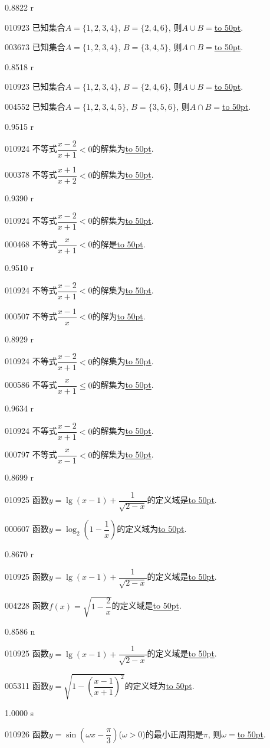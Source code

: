 \documentclass[10pt,a4paper]{article}
\newcommand{\blank}[1]{\underline{\hbox to #1pt{}}}
\begin{document}
0.8822 r

010923	已知集合$A=\{1,2,3,4\}$, $B=\{2,4,6\}$, 则$A\cup B=$\blank{50}.

003673	已知集合$A=\{1,2,3,4\}$, $B=\{3,4,5\}$, 则$A\cap B=$\blank{50}.

0.8518 r

010923	已知集合$A=\{1,2,3,4\}$, $B=\{2,4,6\}$, 则$A\cup B=$\blank{50}.

004552	已知集合$A=\{1,2,3,4,5\}$, $B=\{3,5,6\}$, 则$A\cap B=$\blank{50}.

0.9515 r

010924	不等式$\dfrac{x-2}{x+1}<0$的解集为\blank{50}.

000378	不等式$\dfrac{x+1}{x+2}<0$的解集为\blank{50}.

0.9390 r

010924	不等式$\dfrac{x-2}{x+1}<0$的解集为\blank{50}.

000468	不等式$\dfrac x{x+1}<0$的解是\blank{50}.

0.9510 r

010924	不等式$\dfrac{x-2}{x+1}<0$的解集为\blank{50}.

000507	不等式$\dfrac{x-1}x<0$的解为\blank{50}.

0.8929 r

010924	不等式$\dfrac{x-2}{x+1}<0$的解集为\blank{50}.

000586	不等式$\dfrac x{x+1}\le 0$的解集为\blank{50}.

0.9634 r

010924	不等式$\dfrac{x-2}{x+1}<0$的解集为\blank{50}.

000797	不等式$\dfrac x{x-1}<0$的解集为\blank{50}.

0.8699 r

010925	函数$y=\lg (x-1)+\dfrac 1{\sqrt {2-x}}$的定义域是\blank{50}.

000607	函数$y=\log_2(1-\dfrac1x)$的定义域为\blank{50}.

0.8670 r

010925	函数$y=\lg (x-1)+\dfrac 1{\sqrt {2-x}}$的定义域是\blank{50}.

004228	函数$f(x)=\sqrt{1-\dfrac 2x}$的定义域是\blank{50}.

0.8586 n

010925	函数$y=\lg (x-1)+\dfrac 1{\sqrt {2-x}}$的定义域是\blank{50}.

005311	函数$y=\sqrt {1-(\dfrac{x-1}{x+1})^2}$的定义域为\blank{50}.

1.0000 s

010926	函数$y=\sin( \omega x-\dfrac{\pi}{3})$($\omega >0$)的最小正周期是$\pi$, 则$\omega =$\blank{50}.
\end{document}
